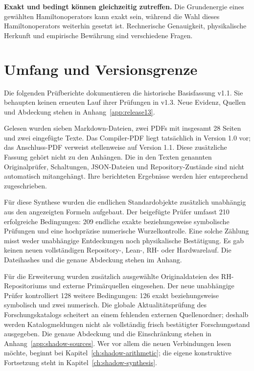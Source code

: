 \documentclass[11pt,a4paper,oneside,parskip=half,headings=normal]{scrreprt}
\begin{document}
\textbf{Exakt und bedingt können gleichzeitig zutreffen.} Die Grundenergie eines gewählten Hamiltonoperators kann exakt sein, während die Wahl dieses Hamiltonoperators weiterhin gesetzt ist. Rechnerische Genauigkeit, physikalische Herkunft und empirische Bewährung sind verschiedene Fragen.

\section*{Umfang und Versionsgrenze}
Die folgenden Prüfberichte dokumentieren die historische Basisfassung v1.1. Sie behaupten keinen erneuten Lauf ihrer Prüfungen in v1.3. Neue Evidenz, Quellen und Abdeckung stehen in Anhang~\ref{app:release13}.

Gelesen wurden sieben Markdown-Dateien, zwei PDFs mit insgesamt 28 Seiten und zwei eingefügte Texte. Das Compiler-PDF liegt tatsächlich in Version 1.0 vor; das Anschluss-PDF verweist stellenweise auf Version 1.1. Diese zusätzliche Fassung gehört nicht zu den Anhängen. Die in den Texten genannten Originalprüfer, Schaltungen, JSON-Dateien und Repository-Zustände sind nicht automatisch mitangehängt. Ihre berichteten Ergebnisse werden hier entsprechend zugeschrieben.

Für diese Synthese wurden die endlichen Standardobjekte zusätzlich unabhängig aus den angezeigten Formeln aufgebaut. Der beigefügte Prüfer umfasst 210 erfolgreiche Bedingungen: 209 endliche exakte beziehungsweise symbolische Prüfungen und eine hochpräzise numerische Wurzelkontrolle. Eine solche Zählung misst weder unabhängige Entdeckungen noch physikalische Bestätigung. Es gab keinen neuen vollständigen Repository-, Lean-, RH- oder Hardwarelauf. Die Dateihashes und die genaue Abdeckung stehen im Anhang.

Für die Erweiterung wurden zusätzlich ausgewählte Originaldateien des RH-Repositoriums und externe Primärquellen eingesehen. Der neue unabhängige Prüfer kontrolliert 128 weitere Bedingungen: 126 exakt beziehungsweise symbolisch und zwei numerisch. Die globale Aktualitätsprüfung des Forschungskatalogs scheitert an einem fehlenden externen Quellenordner; deshalb werden Katalogmeldungen nicht als vollständig frisch bestätigter Forschungsstand ausgegeben. Die genaue Abdeckung und die Einschränkung stehen in Anhang~\ref{app:shadow-sources}. Wer vor allem die neuen Verbindungen lesen möchte, beginnt bei Kapitel~\ref{ch:shadow-arithmetic}; die eigene konstruktive Fortsetzung steht in Kapitel~\ref{ch:shadow-synthesis}.
\end{document}
